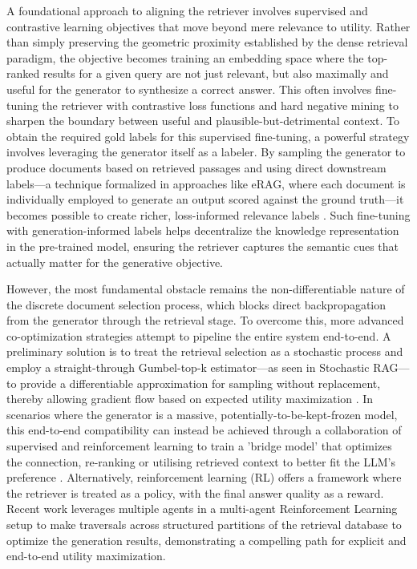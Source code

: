 \documentclass[11pt,a4paper]{article}
\begin{document}
A foundational approach to aligning the retriever involves supervised and contrastive learning objectives that move beyond mere relevance to utility. Rather than simply preserving the geometric proximity established by the dense retrieval paradigm, the objective becomes training an embedding space where the top-ranked results for a given query are not just relevant, but also maximally and useful for the generator to synthesize a correct answer. This often involves fine-tuning the retriever with contrastive loss functions and hard negative mining to sharpen the boundary between useful and plausible-but-detrimental context. To obtain the required gold labels for this supervised fine-tuning, a powerful strategy involves leveraging the generator itself as a labeler. By sampling the generator to produce documents based on retrieved passages and using direct downstream labels---a technique formalized in approaches like eRAG, where each document is individually employed to generate an output scored against the ground truth---it becomes possible to create richer, loss-informed relevance labels \cite{arxiv:2404.13781v1}. Such fine-tuning with generation-informed labels helps decentralize the knowledge representation in the pre-trained model, ensuring the retriever captures the semantic cues that actually matter for the generative objective.

However, the most fundamental obstacle remains the non-differentiable nature of the discrete document selection process, which blocks direct backpropagation from the generator through the retrieval stage. To overcome this, more advanced co-optimization strategies attempt to pipeline the entire system end-to-end. A preliminary solution is to treat the retrieval selection as a stochastic process and employ a straight-through Gumbel-top-k estimator---as seen in Stochastic RAG---to provide a differentiable approximation for sampling without replacement, thereby allowing gradient flow based on expected utility maximization \cite{arxiv:2403.14374v1}. In scenarios where the generator is a massive, potentially-to-be-kept-frozen model, this end-to-end compatibility can instead be achieved through a collaboration of supervised and reinforcement learning to train a 'bridge model' that optimizes the connection, re-ranking or utilising retrieved context to better fit the LLM's preference \cite{arxiv:2401.06954v2}. Alternatively, reinforcement learning (RL) offers a framework where the retriever is treated as a policy, with the final answer quality as a reward. Recent work \cite{arxiv:2402.07483v1} leverages multiple agents in a multi-agent Reinforcement Learning setup to make traversals across structured partitions of the retrieval database to optimize the generation results, demonstrating a compelling path for explicit and end-to-end utility maximization.
\end{document}
